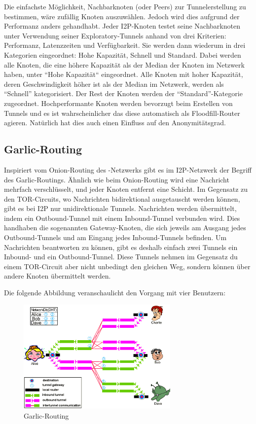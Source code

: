 Die einfachste Möglichkeit, Nachbarknoten (oder Peers) zur Tunnelerstellung zu bestimmen, wäre zufällig Knoten auszuwählen.
Jedoch wird dies aufgrund der Performanz anders gehandhabt.
Jeder I2P-Knoten testet seine Nachbarknoten unter Verwendung seiner Exploratory-Tunnels anhand von drei Kriterien:
Performanz, Latenzzeiten und Verfügbarkeit.
Sie werden dann wiederum in drei Kategorien eingeordnet: Hohe Kapazität, Schnell und Standard.
Dabei werden alle Knoten, die eine höhere Kapazität als der Median der Knoten im Netzwerk haben, unter ``Hohe Kapazität`` eingeordnet.
Alle Knoten mit hoher Kapazität, deren Geschwindigkeit höher ist als der Median im Netzwerk, werden als ``Schnell'' kategorisiert. Der Rest der Knoten werden der ``Standard''-Kategorie zugeordnet.
Hochperformante Knoten werden bevorzugt beim Erstellen von Tunnels und es ist wahrscheinlicher das diese automatisch als Floodfill-Router agieren.
Natürlich hat dies auch einen Einfluss auf den Anonymitätsgrad.
\parencites[S.~4-5]{timpanaro_monitoring_2011}[S. 3]{liu_empirical_2014}

\subsection{Garlic-Routing}\label{sec:garlic_routing}

Inspiriert vom Onion-Routing des -Netzwerks gibt es im I2P-Netzwerk der Begriff des Garlic-Routings.
Ähnlich wie beim Onion-Routing wird eine Nachricht mehrfach verschlüsselt, und jeder Knoten entfernt eine Schicht.
Im Gegensatz zu den TOR-Circuits, wo Nachrichten bidirektional ausgetauscht werden können, gibt es bei I2P nur unidirektionale Tunnels.
Nachrichten werden übermittelt, indem ein Outbound-Tunnel mit einem Inbound-Tunnel verbunden wird.
Dies handhaben die sogenannten Gateway-Knoten, die sich jeweils am Ausgang jedes Outbound-Tunnels und am Eingang jedes Inbound-Tunnels befinden.
Um Nachrichten beantworten zu können, gibt es deshalb einfach zwei Tunnels ein Inbound- und ein Outbound-Tunnel.
Diese Tunnels nehmen im Gegensatz du einem TOR-Circuit aber nicht unbedingt den gleichen Weg, sondern können über andere Knoten übermittelt werden.

Die folgende Abbildung  veranschaulicht den Vorgang mit vier Benutzern:

\begin{figure}[H]
    \centering
    \includegraphics[width=0.7\textwidth]{img/i2prouting.png}
    \caption{Garlic-Routing}\label{fig:garlic_routing}
\end{figure}


